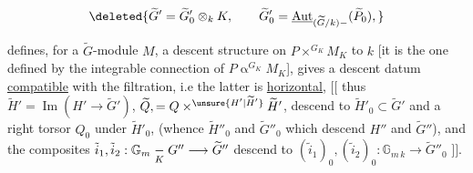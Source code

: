 \[
\deleted{\widetilde G'=\widetilde G'_0\otimes_k K,\qquad
\widetilde G'_0=\underline{\operatorname{Aut}}_{(\widetilde G/k)-}(\widetilde P_0),}
\]

  defines, for a $\widetilde G$-module $M$, a descent structure on $P\mathbin{\times}^{G_K}M_K$ to $k$\unsure{,|;} [it is the one defined by the integrable connection of $P\mathbin{\alpha}^{G_K}M_K$], gives a descent datum \uline{compatible} with the filtration, i.e the latter is \uline{horizontal}, $\bigl[\!\bigl[$ thus  $\widetilde H'=\operatorname{Im}(H'\longrightarrow\widetilde G')$, $\widetilde Q,=Q\mathbin{\times}^{\unsure{H'|\widetilde H'}}\widetilde H'$, descend  to $\widetilde H'_0\subset\widetilde G'$ and a right torsor $Q_0$ under $\widetilde H'_0$,  (whence $\widetilde H''_0$ and $\widetilde G''_0$ which descend $H''$ and $\widetilde G''$), and  the composites $\tilde i_1,\tilde i_2:\mathbb G_m\underset K{\relbar}G''\longrightarrow\widetilde G''$ descend to $(\tilde i_1)_0,(\tilde i_2)_0:\mathbb G_{m\,k}\longrightarrow\widetilde G''_0$ $\bigr]\!\bigr]$.
